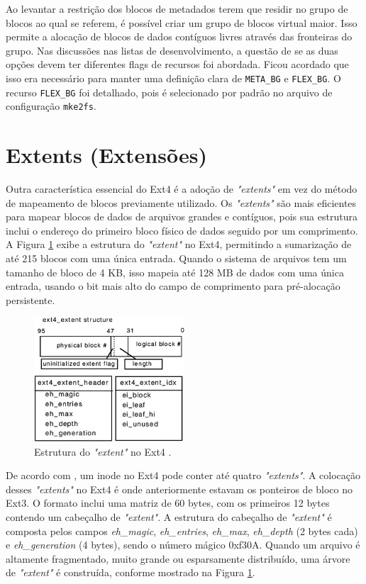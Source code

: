 \documentclass[
	12pt,				%
	openright,			%
	oneside,			%
	a4paper,			%
	chapter=TITLE,		%
	english,			%
	french,				%
	spanish,			%
	brazil				%
	]{abntex2}
\theoremstyle{definition}
\begin{document}
Ao levantar a restrição dos blocos de metadados terem que residir no grupo de blocos ao qual se 
referem, é possível criar um grupo de blocos virtual maior. Isso permite a alocação de blocos de
dados contíguos livres através das fronteiras do grupo. Nas discussões nas listas de desenvolvimento, 
a questão de se as duas opções devem ter diferentes flags de recursos foi abordada. Ficou acordado 
que isso era necessário para manter uma definição clara de \texttt{META\_BG} e \texttt{FLEX\_BG}. 
O recurso \texttt{FLEX\_BG} foi detalhado, pois é selecionado por padrão no arquivo de configuração \texttt{mke2fs}.

\section{Extents (Extensões)}

Outra característica essencial do Ext4 é a adoção de \textit{"extents"} em vez do método de mapeamento 
de blocos previamente utilizado. Os \textit{"extents"} são mais eficientes 
para mapear blocos de dados de arquivos grandes e contíguos, pois sua estrutura inclui o endereço do 
primeiro bloco físico de dados seguido por um comprimento. A Figura \ref{fig:fig10} exibe a estrutura 
do \textit{"extent"} no Ext4, permitindo a sumarização de até 215 blocos com uma única entrada. 
Quando o sistema de arquivos tem um tamanho de bloco de 4 KB, isso mapeia até 128 MB de dados 
com uma única entrada, usando o bit mais alto do campo de comprimento para pré-alocação persistente.

\begin{figure}[H]
    \centering
    \includegraphics[width=0.5\textwidth]{fig10.jpg}
    \caption{Estrutura do \textit{"extent"} no Ext4 \cite{matur}.}
    \label{fig:fig10}
\end{figure}

De acordo com \cite{matur}, um inode no Ext4 pode conter até quatro \textit{"extents"}. A 
colocação desses \textit{"extents"} no Ext4 é onde anteriormente estavam os ponteiros de bloco no 
Ext3. O formato inclui uma matriz de 60 bytes, com os primeiros 12 bytes contendo um cabeçalho de 
\textit{"extent"}. A estrutura do cabeçalho de \textit{"extent"} é composta pelos campos 
\textit{eh\_magic}, \textit{eh\_entries}, \textit{eh\_max}, \textit{eh\_depth} 
(2 bytes cada) e \textit{eh\_generation} (4 bytes), sendo o número mágico 0xf30A. 
Quando um arquivo é altamente fragmentado, muito grande ou esparsamente distribuído, 
uma árvore de \textit{"extent"} é construída, conforme mostrado na Figura \ref{fig:fig10}.
\end{document}
